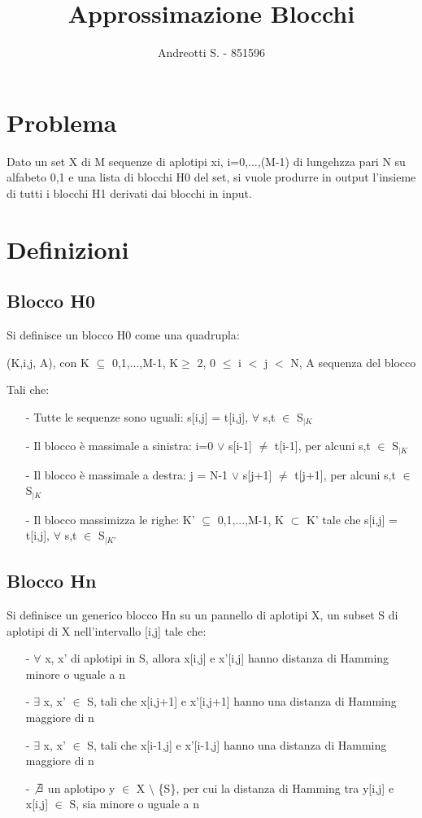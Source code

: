 \documentclass{article}
\title{Approssimazione Blocchi}
\author{Andreotti S. - 851596}
\date{}
\begin{document}
\maketitle

\section{Problema}
Dato un set X di M sequenze di aplotipi xi, i=0,...,(M-1) di lungehzza pari N su alfabeto {0,1} e una lista di blocchi H0 del set, si vuole produrre in output l'insieme di tutti i blocchi H1 derivati dai blocchi in input.

\section{Definizioni}

\subsection{Blocco H0}
Si definisce un blocco H0 come una quadrupla:
\begin{center}
    (K,i,j, A), con K $\subseteq$ {0,1,...,M-1}, \textbar K\textbar $\geq$ 2, 0 $\leq$ i $<$ j $<$ N, A sequenza del blocco
\end{center}
Tali che:
\begin{itemize}
    \item[-] Tutte le sequenze sono uguali: s[i,j] = t[i,j], $\forall$ s,t $\in$ S$_{|K}$
    \item[-] Il blocco è massimale a sinistra: i=0 $\vee$ s[i-1] $\neq$ t[i-1], per alcuni s,t $\in$ S$_{|K}$
    \item[-] Il blocco è massimale a destra: j = N-1 $\vee$ s[j+1] $\neq$ t[j+1], per alcuni s,t $\in$ S$_{|K}$
    \item[-] Il blocco massimizza le righe: K' $\subseteq$ {0,1,...,M-1}, K $\subset$ K' tale che s[i,j] = t[i,j], $\forall$ s,t $\in$ S$_{|K'}$
\end{itemize}

\subsection{Blocco Hn}
Si definisce un generico blocco Hn su un pannello di aplotipi X, un subset S di aplotipi di X nell'intervallo [i,j] tale che:

\begin{itemize}
    \item[-] $\forall$ x, x' di aplotipi in S, allora x[i,j] e x'[i,j] hanno distanza di Hamming minore o uguale a n
    \item[-] $\exists$ x, x' $\in$ S, tali che x[i,j+1] e x'[i,j+1] hanno una distanza di Hamming maggiore di n
    \item[-] $\exists$ x, x' $\in$ S, tali che x[i-1,j] e x'[i-1,j] hanno una distanza di Hamming maggiore di n
    \item[-] $\not \exists$ un aplotipo y $\in$ X $\setminus$ \{S\}, per cui la distanza di Hamming tra y[i,j] e x[i,j] $\in$ S, sia minore o uguale a n
\end{itemize}
\end{document}
